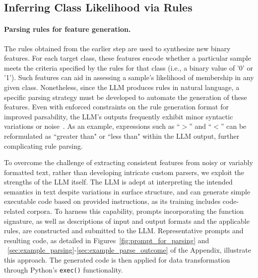 \subsection{Inferring Class Likelihood via Rules}
\label{Sec:training}

\paragraph{Parsing rules for feature generation.} The rules obtained from the earlier step are used to synthesize new binary features. For each target class, these features encode whether a particular sample meets the criteria specified by the rules for that class (i.e., a binary value of '0' or '1'). Such features can aid in assessing a sample's likelihood of membership in any given class. Nonetheless, since the LLM produces rules in natural language, a specific parsing strategy must be developed to automate the generation of these features. Even with enforced constraints on the rule generation format for improved parsability, the LLM's outputs frequently exhibit minor syntactic variations or noise~\cite{kovavc2023large}. As an example, expressions such as ``$>$” and ``$<$” can be reformulated as ``greater than" or ``less than" within the LLM output, further complicating rule parsing.

To overcome the challenge of extracting consistent features from noisy or variably formatted text, rather than developing intricate custom parsers, we exploit the strengths of the LLM itself. The LLM is adept at interpreting the intended semantics in text despite variations in surface structure, and can generate simple executable code based on provided instructions, as its training includes code-related corpora. To harness this capability, prompts incorporating the function signature, as well as descriptions of input and output formats and the applicable rules, are constructed and submitted to the LLM. Representative prompts and resulting code, as detailed in Figures~\ref{fig:prompt_for_parsing} and ~\ref{sec:example_parsing}-\ref{sec:example_parse_outcome} of the Appendix, illustrate this approach. The generated code is then applied for data transformation through Python’s \texttt{exec()} functionality.

\vspace*{-0.12in}

